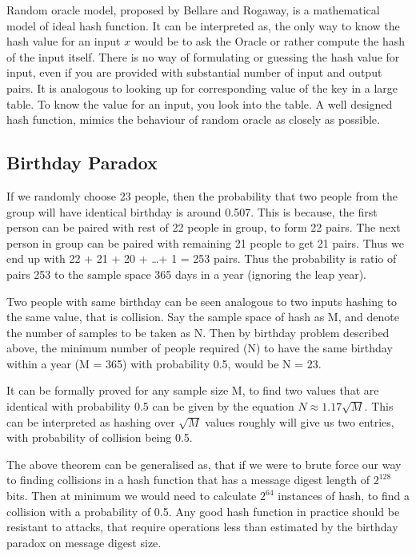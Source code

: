   Random oracle model, proposed by Bellare and Rogaway, is a mathematical model of ideal hash function.
  It can be interpreted as, the only way to know the hash value for an input $x$ would be to
  ask the Oracle or rather compute the hash of the input itself. There is no way of formulating or 
  guessing the hash value for input, even if you are provided with substantial number of input and output
  pairs. It is analogous to looking up for corresponding value of the key in a large table. To know the
  value for an input, you look into the table. A well designed hash function, mimics the behaviour of
  random oracle as closely as possible. 

  \subsection{ Birthday Paradox }
  If we randomly choose 23 people, then the probability that two people from the group will have identical
  birthday is around 0.507. This is because, the first person can be paired with rest of 22 people in group,
  to form 22 pairs. The next person in group can be paired with remaining 21 people to get 21 pairs. Thus 
  we end up with 22 + 21 + 20 + \ldots + 1 = 253 pairs. Thus the probability is ratio of pairs 253 to the
  sample space 365 days in a year (ignoring the leap year).

  Two people with same birthday can be seen analogous to two inputs hashing to the same value, that is 
  collision. Say the sample space of hash as M, and denote the number of samples to be taken as N. Then 
  by birthday problem described above, the minimum number of people required (N) to have the same birthday 
  within a year (M = 365) with probability 0.5, would be N = 23.

  It can be formally proved for any sample size M, to find two values that are identical with probability
  0.5 can be given by the equation $N \approx 1.17 \sqrt{M}$. This can be interpreted as hashing over $\sqrt{M}$
  values roughly will give us two entries, with probability of collision being 0.5.

  The above theorem can be generalised as, that if we were to brute force our way to finding collisions in
  a hash function that has a message digest length of $2^{128}$ bits. Then at minimum we would need to 
  calculate $2^{64}$ instances of hash, to find a collision with a probability of 0.5. Any good hash function 
  in practice should be resistant to attacks, that require operations less than estimated by the birthday 
  paradox on message digest size.

